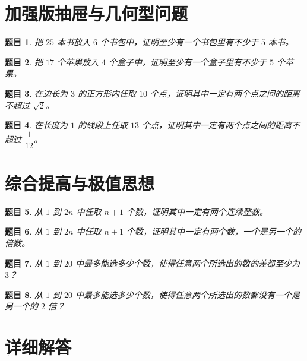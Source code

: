 \documentclass[11pt,a4paper,fontset=fandol]{ctexart}
\theoremstyle{formalexample}
\newtheorem{exercise}{题目}[section]
\begin{document}
\section{加强版抽屉与几何型问题}

\begin{exercise}
把 $25$ 本书放入 $6$ 个书包中，证明至少有一个书包里有不少于 $5$ 本书。
\end{exercise}

\begin{exercise}
把 $17$ 个苹果放入 $4$ 个盒子中，证明至少有一个盒子里有不少于 $5$ 个苹果。
\end{exercise}

\begin{exercise}
在边长为 $3$ 的正方形内任取 $10$ 个点，证明其中一定有两个点之间的距离不超过 $\sqrt{2}$。
\end{exercise}

\begin{exercise}
在长度为 $1$ 的线段上任取 $13$ 个点，证明其中一定有两个点之间的距离不超过 $\dfrac{1}{12}$。
\end{exercise}

\section{综合提高与极值思想}

\begin{exercise}
从 $1$ 到 $2n$ 中任取 $n+1$ 个数，证明其中一定有两个连续整数。
\end{exercise}

\begin{exercise}
从 $1$ 到 $2n$ 中任取 $n+1$ 个数，证明其中一定有两个数，一个是另一个的倍数。
\end{exercise}

\begin{exercise}
从 $1$ 到 $20$ 中最多能选多少个数，使得任意两个所选出的数的差都至少为 $3$？
\end{exercise}

\begin{exercise}
从 $1$ 到 $20$ 中最多能选多少个数，使得任意两个所选出的数都没有一个是另一个的 $2$ 倍？
\end{exercise}

\newpage
\section{详细解答}
\end{document}
